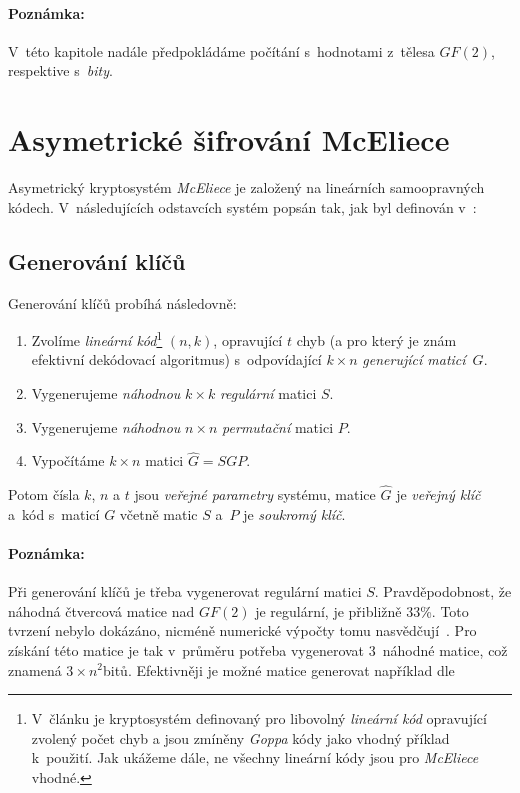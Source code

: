 \documentclass[thesis=M,czech,hidelinks]{FITthesis}[2012/06/26]
\newcommand{\0}{{\textcolor[gray]{0.75}{0}}}
\begin{document}
\paragraph{Poznámka:} V~této kapitole nadále předpokládáme počítání
s~hodnotami z~tělesa $GF(2)$, respektive s~\emph{bity}.


\section{Asymetrické šifrování McEliece}\label{kap_sifrovani_mceliece}

Asymetrický kryptosystém \emph{McEliece} je založený na lineárních samoopravných
kódech. V~následujících odstavcích systém popsán tak, jak byl definován
v~\cite{McEliece}:

\subsection{Generování klíčů}

Generování klíčů probíhá následovně:

\begin{enumerate}
    \item Zvolíme \emph{lineární kód}\footnote{
            V~článku je kryptosystém definovaný pro libovolný \emph{lineární
            kód} opravující zvolený počet chyb a jsou zmíněny \emph{Goppa} kódy
            jako vhodný příklad k~použití. Jak ukážeme dále, ne všechny
            lineární kódy jsou pro \emph{McEliece} vhodné.
        } $(n,k)$, opravující $t$ chyb (a pro který je znám efektivní dekódovací
        algoritmus) s~odpovídající $k \times n$ \emph{generující maticí}~$G$.
    \item Vygenerujeme \emph{náhodnou} $k \times k$ \emph{regulární} matici $S$.
    \item Vygenerujeme \emph{náhodnou} $n \times n$ \emph{permutační} matici $P$.
    \item Vypočítáme $k \times n$ matici $\hat{G} = S G P$.
\end{enumerate}

Potom čísla $k$, $n$ a $t$ jsou \emph{veřejné parametry} systému, matice
$\hat{G}$ je \emph{veřejný klíč} a~kód s~maticí $G$ včetně matic $S$ a~$P$ je
\emph{soukromý klíč}.

\paragraph{Poznámka:} Při generování klíčů je třeba vygenerovat regulární matici
$S$. Pravděpodobnost, že náhodná čtvercová matice nad $GF(2)$ je regulární, je
přibližně $33$\;\%.  Toto tvrzení nebylo dokázáno, nicméně numerické výpočty
tomu nasvědčují~\cite{Heyse}. Pro získání této matice je tak v~průměru potřeba
vygenerovat $3$~náhodné matice, což znamená $3\times n^2$\;bitů. Efektivněji je
možné matice generovat například dle~\cite{Randall}
\end{document}
